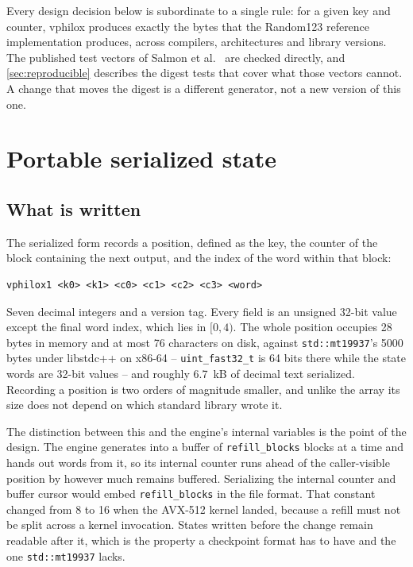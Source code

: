 \documentclass[acmsmall,screen,review]{acmart}
\theoremstyle{acmdefinition}
\newcommand{\code}[1]{\texttt{#1}}
\begin{document}
Every design decision below is subordinate to a single rule: for a given key
and counter, vphilox produces exactly the bytes that the Random123 reference
implementation produces, across compilers, architectures and library versions.
The published test vectors of Salmon et al.~\cite{salmon2011} are checked
directly, and \cref{sec:reproducible} describes the digest tests that cover what
those vectors cannot. A change that moves the digest is a different generator,
not a new version of this one.

\section{Portable serialized state}\label{sec:state}

\subsection{What is written}

The serialized form records a position, defined as the key, the counter of the
block containing the next output, and the index of the word within that block:

\begin{lstlisting}
vphilox1 <k0> <k1> <c0> <c1> <c2> <c3> <word>
\end{lstlisting}

Seven decimal integers and a version tag. Every field is an unsigned 32-bit
value except the final word index, which lies in $[0, 4)$. The whole position
occupies 28 bytes in memory and at most 76 characters on disk, against
\code{std::mt19937}'s 5000 bytes under libstdc++ on x86-64 -- \code{uint\_fast32\_t}
is 64 bits there while the state words are 32-bit values -- and roughly 6.7~kB
of decimal text serialized. Recording a position is two orders of magnitude
smaller, and unlike the array its size does not depend on which standard library
wrote it.

The distinction between this and the engine's internal variables is the point
of the design. The engine generates into a buffer of \code{refill\_blocks}
blocks at a time and hands out words from it, so its internal counter runs
ahead of the caller-visible position by however much remains buffered.
Serializing the internal counter and buffer cursor would embed
\code{refill\_blocks} in the file format. That constant changed from 8 to 16
when the AVX-512 kernel landed, because a refill must not be split across a
kernel invocation. States written before the change remain readable after it,
which is the property a checkpoint format has to have and the one
\code{std::mt19937} lacks.
\end{document}
